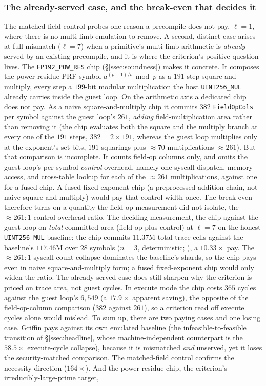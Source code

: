 \subsubsection{The already-served case, and the break-even that decides it}\label{sssec:already-served}
The matched-field control probes one reason a precompile does not pay, $\ell=1$, where there is no multi-limb emulation to remove. A second, distinct case arises at full mismatch ($\ell=7$) when a primitive's multi-limb arithmetic is \emph{already} served by an existing precompile, and it is where the criterion's positive question lives. The \texttt{FP192\_POW\_RES} chip (\S\ref{ssec:soundness}) makes it concrete. It composes the power-residue-PRF symbol $a^{(p-1)/t}\bmod p$ as a $191$-step square-and-multiply, every step a $199$-bit modular multiplication the host \texttt{UINT256\_MUL} already carries inside the guest loop. On the arithmetic axis a dedicated chip does not pay. As a naive square-and-multiply chip it commits $382$ \texttt{FieldOpCols} per symbol against the guest loop's $261$, \emph{adding} field-multiplication area rather than removing it (the chip evaluates both the square and the multiply branch at every one of the $191$ steps, $382=2\times191$, whereas the guest loop multiplies only at the exponent's set bits, $191$ squarings plus ${\approx}70$ multiplications ${\approx}261$). But that comparison is incomplete. It counts field-op columns only, and omits the guest loop's per-symbol \emph{control} overhead, namely one syscall dispatch, memory access, and cross-table lookup for each of the ${\approx}261$ multiplications, against one for a fused chip. A fused fixed-exponent chip (a preprocessed addition chain, not naive square-and-multiply) would pay that control width once. The break-even therefore turns on a quantity the field-op measurement did not isolate, the ${\approx}261{:}1$ control-overhead ratio. The deciding measurement, the chip against the guest loop on \emph{total} committed area (field-op plus control) at $\ell=7$ on the honest \texttt{UINT256\_MUL} baseline: the chip commits $11.37$M total trace cells against the baseline's $117.46$M over $28$ symbols ($n{=}3$, deterministic; ), a $10.33\times$ pay. The ${\approx}261{:}1$ syscall-count collapse dominates the baseline's shards, so the chip pays even in naive square-and-multiply form; a fused fixed-exponent chip would only widen the ratio. The already-served case does still sharpen why the criterion is priced on trace area, not guest cycles. In execute mode the chip costs $365$ cycles against the guest loop's $6{,}549$ (a $17.9\times$ apparent saving), the opposite of the field-op-column comparison ($382$ against $261$), so a criterion read off execute cycles alone would mislead. To sum up, there are two paying cases and one losing case. Griffin pays against its own emulated baseline (the infeasible-to-feasible transition of \S\ref{ssec:headline}, whose machine-independent counterpart is the $58.5\times$ execute-cycle collapse), because it is mismatched \emph{and} unserved, yet it loses the security-matched comparison. The matched-field control confirms the necessity direction ($164\times$). And the power-residue chip, the criterion's irreducibly-large-prime target, 